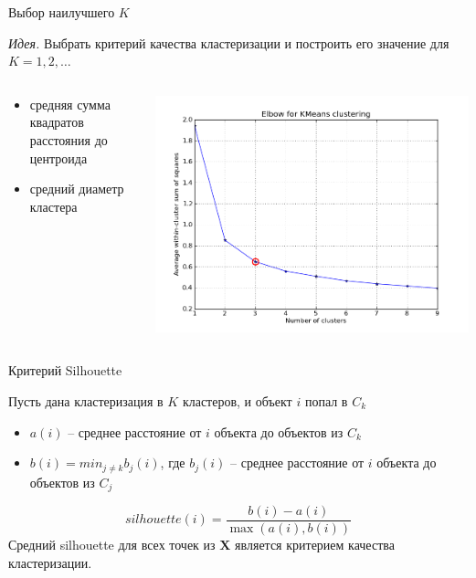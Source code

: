 \documentclass[10pt]{beamer}
\begin{document}
\begin{frame}{Выбор наилучшего $K$}

{\it Идея.} Выбрать критерий качества кластеризации и построить его значение для $K = 1, 2, \ldots$

\begin{columns}[C]
    \begin{column}{.5\textwidth} 
    \begin{itemize}
	\item средняя сумма квадратов расстояния до центроида
	\item средний диаметр кластера
	\end{itemize} 		    
    \end{column}
    \begin{column}{.5\textwidth}
    \vspace{1em}
    \includegraphics[scale=0.3]{images/elbow.png}    
    \end{column}
\end{columns}

\end{frame}

\begin{frame}{Критерий Silhouette}

Пусть дана кластеризация в $K$ кластеров, и объект $i$ попал в $C_k$

\vspace{1em}
\begin{itemize}
\item $a(i)$ -- среднее расстояние от $i$ объекта до объектов из $C_k$
\item $b(i) = min_{j \neq k} b_j(i)$,  где $b_j(i)$ -- среднее расстояние от $i$ объекта до объектов из $C_j$
\end{itemize}
\[
silhouette(i) = \frac{b(i) - a(i)}{\max(a(i), b(i))}
\]
Средний silhouette для всех точек из $\mathbf{X}$ является критерием качества кластеризации.

\end{frame}
\end{document}
